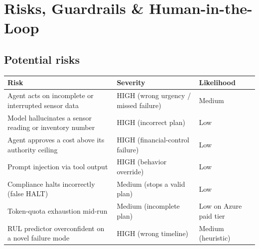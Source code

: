 \documentclass[11pt,a4paper]{article}
\let\oldsection\section
\renewcommand{\section}{\needspace{7\baselineskip}\oldsection}
\let\oldsubsection\subsection
\renewcommand{\subsection}{\needspace{5\baselineskip}\oldsubsection}
\begin{document}
\section{Risks, Guardrails \& Human-in-the-Loop}

\subsection*{Potential risks}
\begin{longtable}{>{\raggedright\arraybackslash}p{8.0cm} >{\raggedright\arraybackslash}p{4.4cm} >{\raggedright\arraybackslash}p{2.4cm}}
\toprule
\textbf{Risk} & \textbf{Severity} & \textbf{Likelihood} \\
\midrule
\endhead
Agent acts on incomplete or interrupted sensor data & HIGH (wrong urgency / missed failure) & Medium \\
Model hallucinates a sensor reading or inventory number & HIGH (incorrect plan) & Low \\
Agent approves a cost above its authority ceiling & HIGH (financial-control failure) & Low \\
Prompt injection via tool output & HIGH (behavior override) & Low \\
Compliance halts incorrectly (false HALT) & Medium (stops a valid plan) & Low \\
Token-quota exhaustion mid-run & Medium (incomplete plan) & Low on Azure paid tier \\
RUL predictor overconfident on a novel failure mode & HIGH (wrong timeline) & Medium (heuristic) \\
\bottomrule
\end{longtable}
\end{document}

